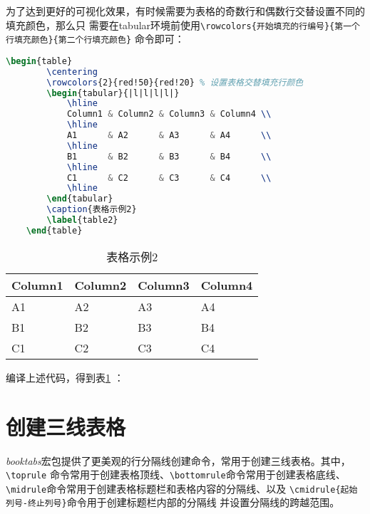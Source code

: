 为了达到更好的可视化效果，有时候需要为表格的奇数行和偶数行交替设置不同的填充颜色，那么只
需要在tabular环境前使用\texttt{\textbackslash{}rowcolors\{开始填充的行编号\}\{第一个行填充颜色\}\{第二个行填充颜色\}}
命令即可：
\begin{lstlisting}[language=TeX]
    \begin{table}
        \centering
        \rowcolors{2}{red!50}{red!20} % 设置表格交替填充行颜色
        \begin{tabular}{|l|l|l|l|}
            \hline
            Column1 & Column2 & Column3 & Column4 \\
            \hline
            A1      & A2      & A3      & A4      \\
            \hline
            B1      & B2      & B3      & B4      \\
            \hline
            C1      & C2      & C3      & C4      \\
            \hline
        \end{tabular}
        \caption{表格示例2}
        \label{table2}
    \end{table}
\end{lstlisting}

\begin{table}
    \centering
    \begin{tabular}{|l|l|l|l|}
        \hline
        Column1 & Column2 & Column3 & Column4 \\
        \hline
        A1      & A2      & A3      & A4      \\
        \hline
        B1      & B2      & B3      & B4      \\
        \hline
        C1      & C2      & C3      & C4      \\
        \hline
    \end{tabular}
    \caption{表格示例2}
    \label{table2}
\end{table}
编译上述代码，得到表\ref{table2} ：

\section{创建三线表格}

\emph{booktabs}宏包提供了更美观的行分隔线创建命令，常用于创建三线表格。其中，\texttt{\textbackslash{}toprule}
命令常用于创建表格顶线、\texttt{\textbackslash{}bottomrule}命令常用于创建表格底线、
\texttt{\textbackslash{}midrule}命令常用于创建表格标题栏和表格内容的分隔线、以及
\texttt{\textbackslash{}cmidrule\{起始列号-终止列号\}}命令用于创建标题栏内部的分隔线
并设置分隔线的跨越范围。

